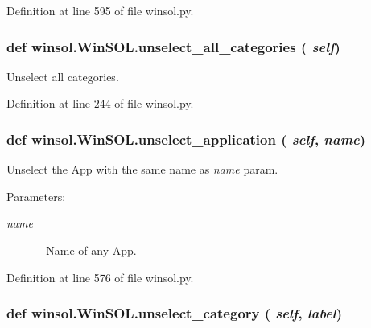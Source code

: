 Definition at line 595 of file winsol.py.\hypertarget{classwinsol_1_1WinSOL_7a85278fbfa4eaa1ce220a623ad80f4e}{
\subsubsection[unselect\_\-all\_\-categories]{\setlength{\rightskip}{0pt plus 5cm}def winsol.Win\-SOL.unselect\_\-all\_\-categories ( {\em self})}}
\label{classwinsol_1_1WinSOL_7a85278fbfa4eaa1ce220a623ad80f4e}


Unselect all categories. 



Definition at line 244 of file winsol.py.\hypertarget{classwinsol_1_1WinSOL_44de84f8ca15802c0c66d3767001e8d9}{
\subsubsection[unselect\_\-application]{\setlength{\rightskip}{0pt plus 5cm}def winsol.Win\-SOL.unselect\_\-application ( {\em self},  {\em name})}}
\label{classwinsol_1_1WinSOL_44de84f8ca15802c0c66d3767001e8d9}


Unselect the App with the same name as {\em name\/} param. 

\begin{Desc}
\item[Parameters:]
\begin{description}
\item[{\em name}]- Name of any App. \end{description}
\end{Desc}


Definition at line 576 of file winsol.py.\hypertarget{classwinsol_1_1WinSOL_102594d43dfff1afc4485b26b35c818b}{
\subsubsection[unselect\_\-category]{\setlength{\rightskip}{0pt plus 5cm}def winsol.Win\-SOL.unselect\_\-category ( {\em self},  {\em label})}}
\label{classwinsol_1_1WinSOL_102594d43dfff1afc4485b26b35c818b}


